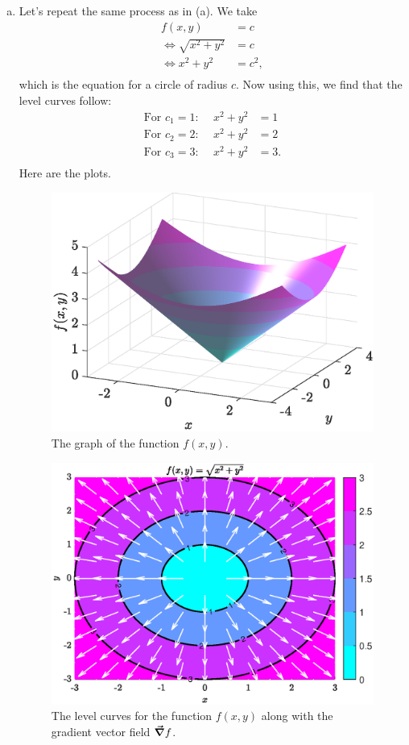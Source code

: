 \documentclass[12pt]{article} %
\begin{document}
\begin{solution}
\begin{enumerate}[(a)]
    \item Let's repeat the same process as in (a). We take
    \begin{align*}
        f(x,y)&=c\\
        \iff \sqrt{x^2+y^2}&= c\\
        \iff x^2+y^2&=c^2,\\
    \end{align*}
    which is the equation for a circle of radius $c$. Now using this, we find that the level curves follow:
    \begin{align*}
        \textrm{For $c_1=1$:~}\quad x^2+y^2&=1\\
        \textrm{For $c_2=2$:~}\quad x^2+y^2&=2\\
        \textrm{For $c_3=3$:~}\quad x^2+y^2&=3.\\
    \end{align*}
    Here are the plots.
    \begin{figure}[H]
        \centering
        \includegraphics[width=.65\textwidth]{figures/7b_surface}
        \caption{The graph of the function $f(x,y)$.}
    \end{figure}
    \begin{figure}[H]
        \centering
        \includegraphics[width=.65\textwidth]{figures/7b_contour}
        \caption{The level curves for the function $f(x,y)$ along with the gradient vector field $\boldsymbol{\vec{\nabla}} f$.}
    \end{figure}


\end{enumerate}
\end{solution}
\end{document}
